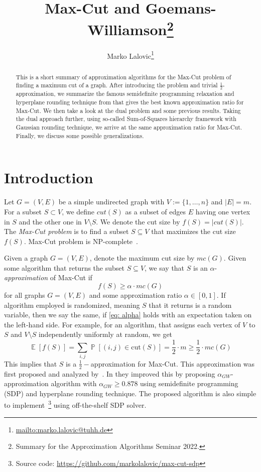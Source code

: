 \documentclass[twoside,leqno,twocolumn]{article}
\DeclareMathOperator{\Ex}{\mathbb{E}}
\DeclareMathOperator{\Prob}{\mathbb{P}}
\begin{document}
\title{\Large Max-Cut and Goemans-Williamson\thanks{Summary for the Approximation Algorithms Seminar 2022.}}
\author{Marko Lalovic\thanks{\url{mailto:marko.lalovic@tuhh.de}}}
\maketitle
\afterpage{\cfoot{\thepage}}

\begin{abstract} This is a short summary of approximation algorithms for the Max-Cut problem of finding a maximum cut of a graph. After introducing the problem and trivial $\frac{1}{2}$-approximation, we summarize the famous semidefinite programming relaxation and hyperplane rounding technique from \cite{GW94} that gives the best known approximation ratio for Max-Cut. We then take a look at the dual problem and some previous results. Taking the dual approach further, using so-called Sum-of-Squares hierarchy framework with Gaussian rounding technique, we arrive at the same approximation ratio for Max-Cut. Finally, we discuss some possible generalizations.
\end{abstract}

\section{Introduction} Let $G = (V, E)$ be a simple undirected graph with $V := \lbrace 1, \dots, n \rbrace$ and $|E| = m$. For a subset $S \subset V$, we define $cut(S)$ as a subset of edges $E$ having one vertex in $S$ and the other one in $V \setminus S$. We denote the cut size by $f(S) = |cut(S)|$. The {\it Max-Cut problem} is to find a subset $S \subseteq V$ that maximizes the cut size $f(S)$. Max-Cut problem is NP-complete~\cite{Karp72}. 

Given a graph $G=(V,E)$, denote the maximum cut size by $mc(G)$. Given some algorithm that returns the subset $S \subseteq V$, we say that $S$ is an $\alpha$-{\it approximation} of Max-Cut if
\begin{equation}
f(S) \geq \alpha \cdot mc(G)
\label{eq: alpha}
\end{equation}
for all graphs $G = (V, E)$ and some approximation ratio $\alpha \in [0, 1]$. If algorithm employed is randomized, meaning $S$ that it returns is a random variable, then we say the same, if \ref{eq: alpha} holds with an expectation taken on the left-hand side. For example, for an algorithm, that assigns each vertex of $V$ to $S$ and $V \setminus S$ independently uniformly at random, we get
\begin{equation*}
\Ex[f(S)] = \sum_{i, j} \Prob[(i, j) \in \text{cut}(S)] = \frac{1}{2} \cdot m \geq \frac{1}{2} \cdot mc(G)
\end{equation*}
This implies that $S$ is a $\frac{1}{2}-$approximation for Max-Cut. This approximation was first proposed and analyzed by~\cite{Erd67}. In \cite{GW94} they improved this by proposing $\alpha_{GW}$-approximation algorithm with $\alpha_{GW} \geq 0.878$ using semidefinite programming (SDP) and hyperplane rounding technique. The proposed algorithm is also simple to implement~\footnote{Source code: \url{https://github.com/markolalovic/max-cut-sdp}} using off-the-shelf SDP solver.
\end{document}
